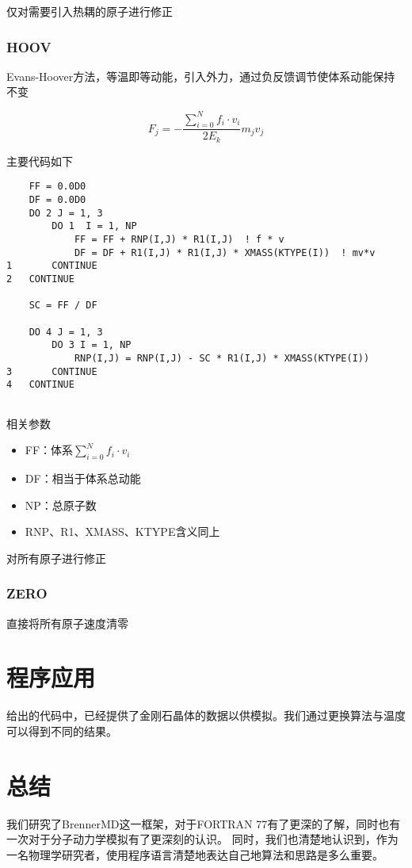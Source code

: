\documentclass[UTF-8]{ctexart}
\begin{document}
仅对需要引入热耦的原子进行修正

\subsubsection{HOOV}

Evans-Hoover方法，等温即等动能，引入外力，通过负反馈调节使体系动能保持不变

\begin{equation}
    F_j = -\frac{\sum^N_{i=0}f_i\cdot v_i}{2E_k}m_jv_j
\end{equation}

主要代码如下

\begin{verbatim}
    FF = 0.0D0
    DF = 0.0D0
    DO 2 J = 1, 3
        DO 1  I = 1, NP
            FF = FF + RNP(I,J) * R1(I,J)  ! f * v
            DF = DF + R1(I,J) * R1(I,J) * XMASS(KTYPE(I))  ! mv*v
1       CONTINUE
2   CONTINUE

    SC = FF / DF

    DO 4 J = 1, 3
        DO 3 I = 1, NP
            RNP(I,J) = RNP(I,J) - SC * R1(I,J) * XMASS(KTYPE(I))
3       CONTINUE
4   CONTINUE
    
\end{verbatim}

\noindent
相关参数

\begin{itemize}
    \item FF：体系$\sum^N_{i=0}f_i\cdot v_i$
    \item DF：相当于体系总动能
    \item NP：总原子数
    \item RNP、R1、XMASS、KTYPE含义同上
\end{itemize}

对所有原子进行修正

\subsubsection{ZERO}

直接将所有原子速度清零

\section{程序应用}
给出的代码中，已经提供了金刚石晶体的数据以供模拟。我们通过更换算法与温度可以得到不同的结果。

\section{总结}
我们研究了BrennerMD这一框架，对于FORTRAN 77有了更深的了解，同时也有一次对于分子动力学模拟有了更深刻的认识。
同时，我们也清楚地认识到，作为一名物理学研究者，使用程序语言清楚地表达自己地算法和思路是多么重要。
\end{document}
